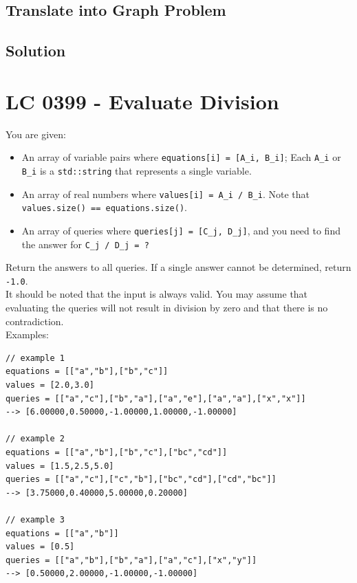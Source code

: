 \subsection*{Translate into Graph Problem}

\subsection*{Solution}

\section{LC 0399 - Evaluate Division}
You are given:
\begin{itemize}
	\item An array of variable pairs where {\colorbox{CodeBackground}{\lstinline|equations[i] = [A_i, B_i]|}}; Each {\colorbox{CodeBackground}{\lstinline|A_i|}} or {\colorbox{CodeBackground}{\lstinline|B_i|}} is a {\colorbox{CodeBackground}{\lstinline|std::string|}} that represents a single variable.
	\item An array of real numbers where {\colorbox{CodeBackground}{\lstinline|values[i] = A_i / B_i|}}. Note that {\colorbox{CodeBackground}{\lstinline|values.size() == equations.size()|}}.
	\item An array of queries where {\colorbox{CodeBackground}{\lstinline|queries[j] = [C_j, D_j]|}}, and you need to find the answer for {\colorbox{CodeBackground}{\lstinline|C_j / D_j = ?|}}
\end{itemize}

Return the answers to all queries. If a single answer cannot be determined, return {\colorbox{CodeBackground}{\lstinline|-1.0|}}.\\

It should be noted that the input is always valid. You may assume that evaluating the queries will not result in division by zero and that there is no contradiction.\\

Examples:
\begin{lstlisting}
// example 1
equations = [["a","b"],["b","c"]]
values = [2.0,3.0]
queries = [["a","c"],["b","a"],["a","e"],["a","a"],["x","x"]]
--> [6.00000,0.50000,-1.00000,1.00000,-1.00000]

// example 2
equations = [["a","b"],["b","c"],["bc","cd"]]
values = [1.5,2.5,5.0]
queries = [["a","c"],["c","b"],["bc","cd"],["cd","bc"]]
--> [3.75000,0.40000,5.00000,0.20000]

// example 3
equations = [["a","b"]]
values = [0.5]
queries = [["a","b"],["b","a"],["a","c"],["x","y"]]
--> [0.50000,2.00000,-1.00000,-1.00000]
\end{lstlisting}

